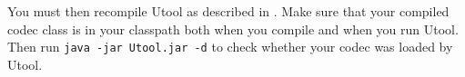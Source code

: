 You must then recompile Utool as described in . Make sure
that your compiled codec class is in your classpath both when you
compile and when you run Utool. Then run \verb?java -jar Utool.jar -d?
to check whether your codec was loaded by Utool.







